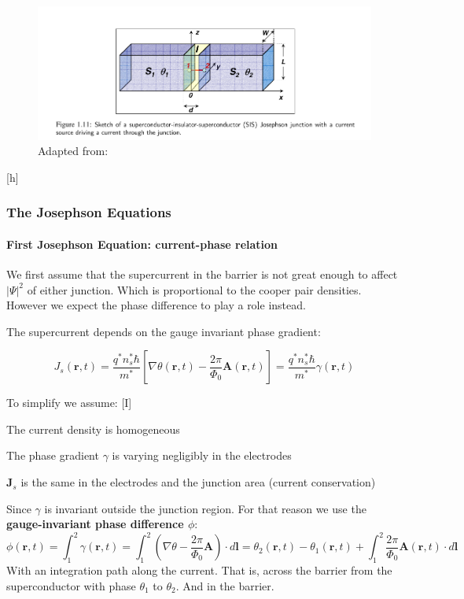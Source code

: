 \documentclass[12pt]{article}
\let\tempthree\enumerate
\let\tempfour\endenumerate
\renewenvironment{enumerate}{\tempthree\setlength{\itemsep}{0pt}}{\tempfour}
\numberwithin{equation}{subsection}
\newcommand\page[1]{
{
}
}
\begin{document}
\begin{figure}[h]
\includegraphics[scale=1.6]{images/superconductor-junction.png}
\caption{Adapted from: \cite{gross2016applied}}
\end{figure}[h]

\subsubsection{The Josephson Equations}
\page{34}
\paragraph{First Josephson Equation: current-phase relation\\}
We first assume that the supercurrent in the barrier is not great enough to affect $|\Psi|^2$ of either junction. Which is proportional to the cooper pair densities. However we expect the phase difference to play a role instead.

The supercurrent depends on the gauge invariant phase gradient:

\begin{equation}
    J_s(\mathbf r, t) = \frac{q^*n_s^*\hbar}{m^*} \left [ \nabla\theta(\mathbf r, t) - \frac{2\pi}{\Phi_0}\mathbf A (\mathbf r, t)  \right] = \frac{q^*n_s^*\hbar}{m^*} \gamma (\mathbf r, t)
\end{equation}

To simplify we assume:
\begin{enumerate}[I]
    \item The current density is homogeneous
    \item The phase gradient $\gamma$ is varying negligibly in the electrodes
    \item $\mathbf J_s$ is the same in the electrodes and the junction area (current conservation)
\end{enumerate}

Since $\gamma$ is invariant outside the junction region. For that reason we use the \textbf{gauge-invariant phase difference $\phi$}:
\begin{equation}
    \phi(\mathbf r, t) = \int^2_1\gamma (\mathbf r, t) = \int^2_1 \left( \nabla \theta - \frac{2\pi}{\Phi_0}\mathbf A \right ) \cdot d\mathbf l = \theta_2(\mathbf r, t) - \theta_1(\mathbf r, t)  +  \int^2_1  \frac{2\pi}{\Phi_0}\mathbf A(\mathbf r, t) \cdot d\mathbf l
\end{equation}
With an integration path along the current. That is, across the barrier from the superconductor with phase $\theta_1$ to $\theta_2$. And in the barrier.
\end{document}
